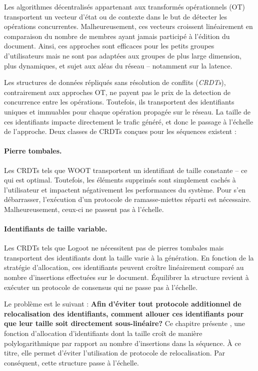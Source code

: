 Les algorithmes décentralisés appartenant aux transformés opérationnels (OT)
transportent un vecteur d'état ou de contexte dans le but de détecter les
opérations concurrentes. Malheureusement, ces vecteurs croissent linéairement en
comparaison du nombre de membres ayant jamais participé à l'édition du
document. Ainsi, ces approches sont efficaces pour les petits groupes
d'utilisateurs mais ne sont pas adaptées aux groupes de plus large dimension,
plus dynamiques, et sujet aux aléas du réseau -- notamment sur la latence.

Les structures de données répliqués sans résolution de conflits (\emph{CRDTs}),
contrairement aux approches OT, ne payent pas le prix de la detection de
concurrence entre les opérations. Toutefois, ils transportent des identifiants
uniques et immuables pour chaque opération propagée sur le réseau. La taille de
ces identifiants impacte directement le trafic généré, et donc le passage à
l'échelle de l'approche. Deux classes de CRDTs conçues pour les séquences
existent :

\paragraph{Pierre tombales.}
Les CRDTs tels que WOOT transportent un identifiant de taille constante -- ce
qui est optimal. Toutefois, les éléments supprimés sont simplement cachés à
l'utilisateur et impactent négativement les performances du système. Pour s'en
débarrasser, l'exécution d'un protocole de ramasse-miettes réparti est
nécessaire. Malheureusement, ceux-ci ne passent pas à l'échelle.

\paragraph{Identifiants de taille variable.}
Les CRDTs tels que Logoot ne nécessitent pas de pierres tombales mais
transportent des identifiants dont la taille varie à la génération. En fonction
de la stratégie d'allocation, ces identifiants peuvent croître linéairement
comparé au nombre d'insertions effectuées sur le document. Équilibrer la
structure revient à exécuter un protocole de consensus qui ne passe pas à
l'échelle.

Le problème est le suivant : \textbf{Afin d'éviter tout protocole additionnel de
relocalisation des identifiants, comment allouer ces identifiants pour que leur
taille soit directement sous-linéaire?} Ce chapitre présente \LSEQ, une fonction
d'allocation d'identifiants dont la taille croît de manière polylogarithmique
par rapport au nombre d'insertions dans la séquence. À ce titre, elle permet
d'éviter l'utilisation de protocole de relocalisation. Par conséquent, cette
structure passe à l'échelle. 

